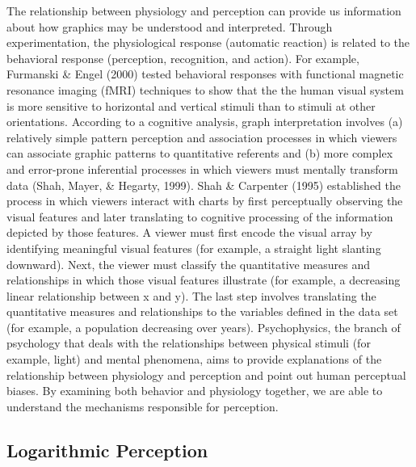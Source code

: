\documentclass[print]{nuthesis}
\begin{document}
The relationship between physiology and perception can provide us information about how graphics may be understood and interpreted.
Through experimentation, the physiological response (automatic reaction) is related to the behavioral response (perception, recognition, and action).
For example, Furmanski \& Engel (2000) tested behavioral responses with functional magnetic resonance imaging (fMRI) techniques to show that the the human visual system is more sensitive to horizontal and vertical stimuli than to stimuli at other orientations.
According to a cognitive analysis, graph interpretation involves (a) relatively simple pattern perception and association processes in which viewers can associate graphic patterns to quantitative referents and (b) more complex and error-prone inferential processes in which viewers must mentally transform data (Shah, Mayer, \& Hegarty, 1999).
Shah \& Carpenter (1995) established the process in which viewers interact with charts by first perceptually observing the visual features and later translating to cognitive processing of the information depicted by those features.
A viewer must first encode the visual array by identifying meaningful visual features (for example, a straight light slanting downward).
Next, the viewer must classify the quantitative measures and relationships in which those visual features illustrate (for example, a decreasing linear relationship between x and y).
The last step involves translating the quantitative measures and relationships to the variables defined in the data set (for example, a population decreasing over years).
Psychophysics, the branch of psychology that deals with the relationships between physical stimuli (for example, light) and mental phenomena, aims to provide explanations of the relationship between physiology and perception and point out human perceptual biases.
By examining both behavior and physiology together, we are able to understand the mechanisms responsible for perception.

\hypertarget{logarithmic-perception}{%
\subsection{Logarithmic Perception}\label{logarithmic-perception}}
\end{document}
